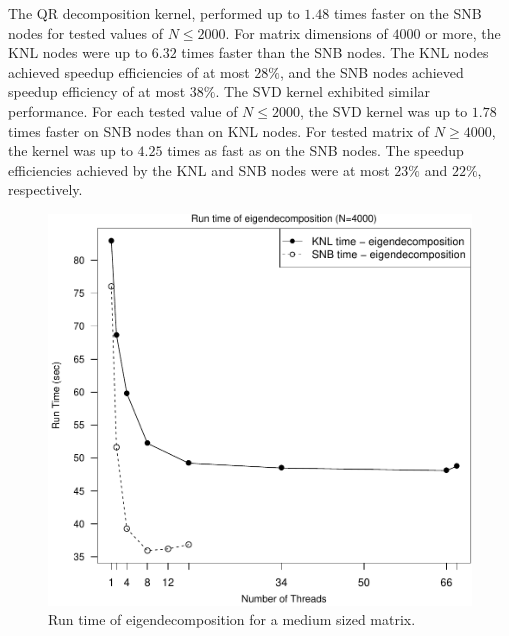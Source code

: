 The QR decomposition kernel, performed up to $1.48$ times faster on the SNB nodes for tested
values of $N \leq 2000$. For matrix dimensions of $4000$ or more, the KNL nodes were up
to $6.32$ times faster than the SNB nodes. The KNL nodes achieved speedup efficiencies of at
most $28\%$, and the SNB nodes achieved speedup efficiency of at most $38\%$. The SVD kernel
exhibited similar performance.  For each tested value of $N \leq 2000$, the
SVD kernel was up to $1.78$ times faster on SNB nodes than on KNL nodes. For tested matrix
of $N \geq 4000$, the kernel was up to $4.25$ times as fast as on the SNB
nodes. The speedup efficiencies achieved by the KNL and SNB nodes
were at most $23\%$ and $22\%$, respectively.
\begin{figure}
\includegraphics[height=\columnwidth, width=\columnwidth]{eigen_4000_68-rt.pdf}
\caption{Run time of eigendecomposition for a medium sized matrix.}
\label{fig:mediumEigenTime}
\end{figure}

